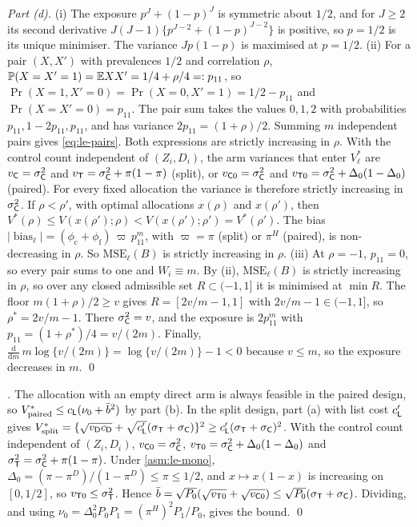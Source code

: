 \emph{Part (d).} (i) The exposure $p^J+(1-p)^J$ is symmetric about $1/2$, and for $J\ge2$ its second derivative $J(J-1)\{p^{J-2}+(1-p)^{J-2}\}$ is positive, so $p=1/2$ is its unique minimiser. The variance $Jp(1-p)$ is maximised at $p=1/2$.
(ii) For a pair $(X,X')$ with prevalences $1/2$ and correlation $\rho$, $\mathbb{P}(X=X'=1)=\mathbb{E} XX'=1/4+\rho/4=:p_{11}$, so $\Pr(X=1,X'=0)=\Pr(X=0,X'=1)=1/2-p_{11}$ and $\Pr(X=X'=0)=p_{11}$. The pair sum takes the values $0,1,2$ with probabilities $p_{11},1-2p_{11},p_{11}$, and has variance $2p_{11}=(1+\rho)/2$. Summing $m$ independent pairs gives \eqref{eq:le-pairs}. Both expressions are strictly increasing in $\rho$. With the control count independent of $(Z_i,D_i)$, the arm variances that enter $V^*_\ell$ are $v_{\mathsf{C}}=\sigma_{\mathsf{C}}^2$ and $v_{\mathsf{T}}=\sigma_{\mathsf{C}}^2+\pi(1-\pi)$ (split), or $v_{\mathsf{C}0}=\sigma_{\mathsf{C}}^2$ and $v_{\mathsf{T}0}=\sigma_{\mathsf{C}}^2+\Delta_0(1-\Delta_0)$ (paired). For every fixed allocation the variance is therefore strictly increasing in $\sigma_{\mathsf{C}}^2$. If $\rho<\rho'$, with optimal allocations $x(\rho)$ and $x(\rho')$, then $V^*(\rho)\le V(x(\rho');\rho)<V(x(\rho');\rho')=V^*(\rho')$. The bias $|\operatorname{bias}_\ell|=(\phi_{\mathrm c}+\phi_{\mathrm f})\,\varpi\,p_{11}^m$, with $\varpi=\pi$ (split) or $\pi^H$ (paired), is non-decreasing in $\rho$. So $\mathrm{MSE}_\ell(B)$ is strictly increasing in $\rho$.
(iii) At $\rho=-1$, $p_{11}=0$, so every pair sums to one and $W_i\equiv m$. By (ii), $\mathrm{MSE}_\ell(B)$ is strictly increasing in $\rho$, so over any closed admissible set $R\subset(-1,1]$ it is minimised at $\min R$. The floor $m(1+\rho)/2\ge v$ gives $R=[2v/m-1,1]$ with $2v/m-1\in(-1,1]$, so $\rho^*=2v/m-1$. There $\sigma_{\mathsf{C}}^2=v$, and the exposure is $2p_{11}^m$ with $p_{11}=(1+\rho^*)/4=v/(2m)$. Finally, $\frac{\mathrm d}{\mathrm dm}\,m\log\{v/(2m)\}=\log\{v/(2m)\}-1<0$ because $v\le m$, so the exposure decreases in $m$. \qed

\emph{.} The allocation with an empty direct arm is always feasible in the paired design, so $V^*_{\mathrm{paired}}\le c_{\mathsf{L}}(\nu_0+\bar b^2)$ by part (b). In the split design, part (a) with list cost $c'_{\mathsf{L}}$ gives $V^*_{\mathrm{split}}=\{\sqrt{v_{\mathsf{D}}c_{\mathsf{D}}}+\sqrt{c'_{\mathsf{L}}}(\sigma_{\mathsf{T}}+\sigma_{\mathsf{C}})\}^2\ge c'_{\mathsf{L}}(\sigma_{\mathsf{T}}+\sigma_{\mathsf{C}})^2$. With the control count independent of $(Z_i,D_i)$, $v_{\mathsf{C}0}=\sigma_{\mathsf{C}}^2$, $v_{\mathsf{T}0}=\sigma_{\mathsf{C}}^2+\Delta_0(1-\Delta_0)$ and $\sigma_{\mathsf{T}}^2=\sigma_{\mathsf{C}}^2+\pi(1-\pi)$. Under \cref{asm:le-mono}, $\Delta_0=(\pi-\pi^D)/(1-\pi^D)\le\pi\le1/2$, and $x\mapsto x(1-x)$ is increasing on $[0,1/2]$, so $v_{\mathsf{T}0}\le\sigma_{\mathsf{T}}^2$. Hence $\bar b=\sqrt{P_0}(\sqrt{v_{\mathsf{T}0}}+\sqrt{v_{\mathsf{C}0}})\le\sqrt{P_0}(\sigma_{\mathsf{T}}+\sigma_{\mathsf{C}})$. Dividing, and using $\nu_0=\Delta_0^2P_0P_1=(\pi^H)^2P_1/P_0$, gives the bound. \qed

